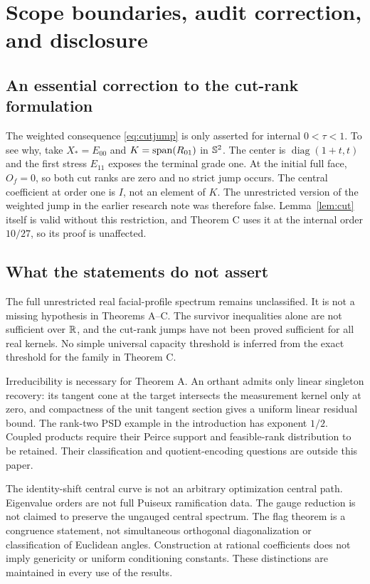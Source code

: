\section{Scope boundaries, audit correction, and disclosure}\label{app:scope}
\subsection{An essential correction to the cut-rank formulation}
The weighted consequence \eqref{eq:cutjump} is only asserted for internal $0<\tau<1$. To see why, take $X_*=E_{00}$ and $K=\operatorname{span}(R_{01})$ in $\mathbb S^2$. The center is $\operatorname{diag}(1+t,t)$ and the first stress $E_{11}$ exposes the terminal grade one. At the initial full face, $O_f=0$, so both cut ranks are zero and no strict jump occurs. The central coefficient at order one is $I$, not an element of $K$. The unrestricted version of the weighted jump in the earlier research note was therefore false. Lemma~\ref{lem:cut} itself is valid without this restriction, and Theorem C uses it at the internal order $10/27$, so its proof is unaffected.

\subsection{What the statements do not assert}
The full unrestricted real facial-profile spectrum remains unclassified. It is not a missing hypothesis in Theorems A--C. The survivor inequalities alone are not sufficient over $\mathbb R$, and the cut-rank jumps have not been proved sufficient for all real kernels. No simple universal capacity threshold is inferred from the exact threshold for the family in Theorem C.

Irreducibility is necessary for Theorem A. An orthant admits only linear singleton recovery: its tangent cone at the target intersects the measurement kernel only at zero, and compactness of the unit tangent section gives a uniform linear residual bound. The rank-two PSD example in the introduction has exponent $1/2$. Coupled products require their Peirce support and feasible-rank distribution to be retained. Their classification and quotient-encoding questions are outside this paper.

The identity-shift central curve is not an arbitrary optimization central path. Eigenvalue orders are not full Puiseux ramification data. The gauge reduction is not claimed to preserve the ungauged central spectrum. The flag theorem is a congruence statement, not simultaneous orthogonal diagonalization or classification of Euclidean angles. Construction at rational coefficients does not imply genericity or uniform conditioning constants. These distinctions are maintained in every use of the results.


